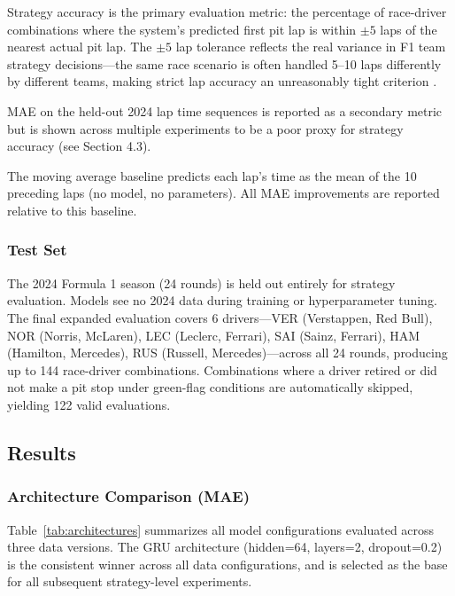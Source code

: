 \documentclass[12pt]{article}
\begin{document}
Strategy accuracy is the primary evaluation metric: the percentage of race-driver combinations where the system's predicted first pit lap is within $\pm 5$ laps of the nearest actual pit lap. The $\pm 5$ lap tolerance reflects the real variance in F1 team strategy decisions---the same race scenario is often handled 5--10 laps differently by different teams, making strict lap accuracy an unreasonably tight criterion \cite{heilmeier2020}.

MAE on the held-out 2024 lap time sequences is reported as a secondary metric but is shown across multiple experiments to be a poor proxy for strategy accuracy (see Section 4.3).

The moving average baseline predicts each lap's time as the mean of the 10 preceding laps (no model, no parameters). All MAE improvements are reported relative to this baseline.

\subsubsection{Test Set}

The 2024 Formula 1 season (24 rounds) is held out entirely for strategy evaluation. Models see no 2024 data during training or hyperparameter tuning. The final expanded evaluation covers 6 drivers---VER (Verstappen, Red Bull), NOR (Norris, McLaren), LEC (Leclerc, Ferrari), SAI (Sainz, Ferrari), HAM (Hamilton, Mercedes), RUS (Russell, Mercedes)---across all 24 rounds, producing up to 144 race-driver combinations. Combinations where a driver retired or did not make a pit stop under green-flag conditions are automatically skipped, yielding 122 valid evaluations.

\subsection{Results}

\subsubsection{Architecture Comparison (MAE)}

Table~\ref{tab:architectures} summarizes all model configurations evaluated across three data versions. The GRU architecture (hidden=64, layers=2, dropout=0.2) is the consistent winner across all data configurations, and is selected as the base for all subsequent strategy-level experiments.
\end{document}
